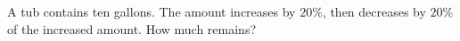 A tub contains ten gallons. The amount increases by $20\%$, then decreases by $20\%$ of the increased amount. How much remains?
